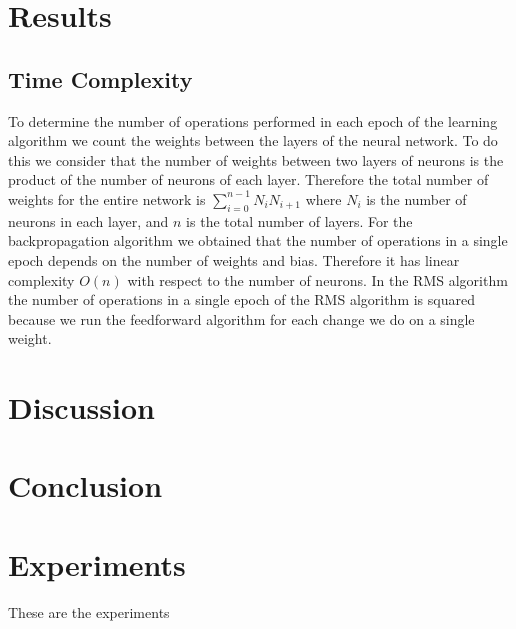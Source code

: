 \documentclass[11pt]{article}
\begin{document}


\section{Results} %
\label{sec:results}

\subsection{Time Complexity} %
\label{sub:time_complexity}

To determine the number of operations performed in each epoch of the learning algorithm we count the weights between the layers of the
neural network. To do this we consider that the number of weights between two layers of neurons is the product of the number of neurons
of each layer. Therefore the total number of weights for the entire network is $\sum_{i=0}^{n-1}N_{i}N_{i+1}$ where $N_{i}$ is the
number of neurons in each layer, and $n$ is the total number of layers. For the backpropagation algorithm we obtained that the number
of operations in a single epoch depends on the number of weights and bias. Therefore it has linear complexity $O(n)$ with respect to
the number of neurons. In the RMS algorithm the number of operations in a single epoch of the RMS algorithm is squared because we run
the feedforward algorithm for each change we do on a single weight.



\section{Discussion} %
\label{sec:discussion}


\section{Conclusion} %
\label{sec:conclusion}


\section{Experiments} %
\label{sec:experiments}

These are the experiments

	
    


\end{document}
